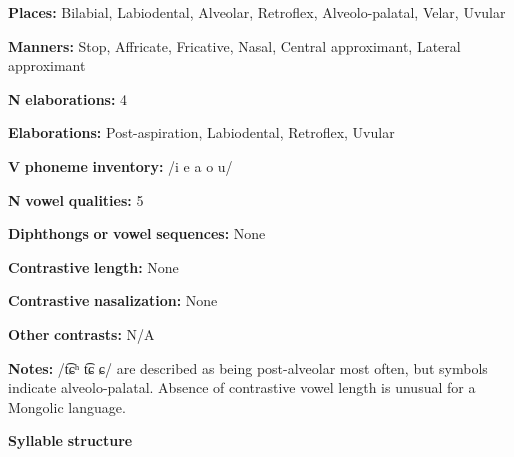 \documentclass[output=paper]{langsci/langscibook}
\begin{document}
\begin{styleBody}
\textbf{Places:} Bilabial, Labiodental, Alveolar, Retroflex, Alveolo-palatal, Velar, Uvular
\end{styleBody}

\begin{styleBody}
\textbf{Manners:} Stop, Affricate, Fricative, Nasal, Central approximant, Lateral approximant
\end{styleBody}

\begin{styleBody}
\textbf{N} \textbf{elaborations:} 4
\end{styleBody}

\begin{styleBody}
\textbf{Elaborations:} Post-aspiration, Labiodental, Retroflex, Uvular
\end{styleBody}

\begin{styleBody}
\textbf{V} \textbf{phoneme} \textbf{inventory:} /i e a o u/
\end{styleBody}

\begin{styleBody}
\textbf{N} \textbf{vowel} \textbf{qualities:} 5
\end{styleBody}

\begin{styleBody}
\textbf{Diphthongs} \textbf{or} \textbf{vowel} \textbf{sequences:} None
\end{styleBody}

\begin{styleBody}
\textbf{Contrastive} \textbf{length:} None
\end{styleBody}

\begin{styleBody}
\textbf{Contrastive} \textbf{nasalization:} None
\end{styleBody}

\begin{styleBody}
\textbf{Other} \textbf{contrasts:} N/A
\end{styleBody}

\begin{styleBody}
\textbf{Notes:} /t͡ɕʰ t͡ɕ ɕ/ are described as being post-alveolar most often, but symbols indicate alveolo-palatal. Absence of contrastive vowel length is unusual for a Mongolic language.
\end{styleBody}

\begin{styleBody}
\textbf{Syllable} \textbf{structure}
\end{styleBody}
\end{document}

